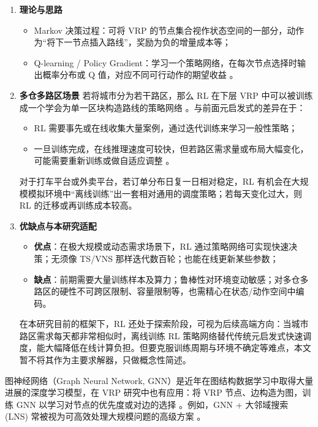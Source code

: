 \documentclass[12pt,a4paper,twoside]{ctexbook}
\begin{document}
\begin{enumerate}
    \item \textbf{理论与思路}
    \begin{itemize}
        \item Markov 决策过程：可将 VRP 的节点集合视作状态空间的一部分，动作为“将下一节点插入路线”，奖励为负的增量成本等；
        \item Q-learning / Policy Gradient：学习一个策略网络，在每次节点选择时输出概率分布或 Q 值，对应不同可行动作的期望收益 \cite{q_learning,policy_gradient}。
    \end{itemize}
    \item \textbf{多仓多路区场景}
    若将城市分为若干路区，那么 RL 在下层 VRP 中可以被训练成一个学会为单一区块构造路线的策略网络 \cite{rl_application}。与前面元启发式的差异在于：
    \begin{itemize}
        \item RL 需要事先或在线收集大量案例，通过迭代训练来学习一般性策略；
        \item 一旦训练完成，在线推理速度可较快，但若路区需求量或布局大幅变化，可能需要重新训练或做自适应调整 \cite{rl_adaptation}。
    \end{itemize}
    对于打车平台或外卖平台，若订单分布日复一日相对稳定，RL 有机会在大规模模拟环境中“离线训练”出一套相对通用的调度策略；若每天变化过大，则 RL 的迁移或再训练成本较高。
    \item \textbf{优缺点与本研究适配}
    \begin{itemize}
        \item \textbf{优点}：在极大规模或动态需求场景下，RL 通过策略网络可实现快速决策；无须像 TS/VNS 那样迭代数百轮；也能在线更新某些参数；
        \item \textbf{缺点}：前期需要大量训练样本及算力；鲁棒性对环境变动敏感；对多仓多路区的硬性不可跨区限制、容量限制等，也需精心在状态/动作空间中编码。
    \end{itemize}
    在本研究目前的框架下，RL 还处于探索阶段，可视为后续高端方向：当城市路区需求每天都非常相似时，离线训练 RL 策略网络替代传统元启发式快速调度，能大幅降低在线计算负担。但要克服训练周期与环境不确定等难点，本文暂不将其作为主要求解器，只做概念性简述。
\end{enumerate}

图神经网络（Graph Neural Network, GNN）是近年在图结构数据学习中取得大量进展的深度学习模型，在 VRP 研究中也有应用：将 VRP 节点、边构造为图，训练 GNN 以学习对节点的优先度或对边的选择 \cite{gnn_intro}。例如，GNN + 大邻域搜索 (LNS) 常被视为可高效处理大规模问题的高级方案 \cite{gnn_lns}。
\end{document}
